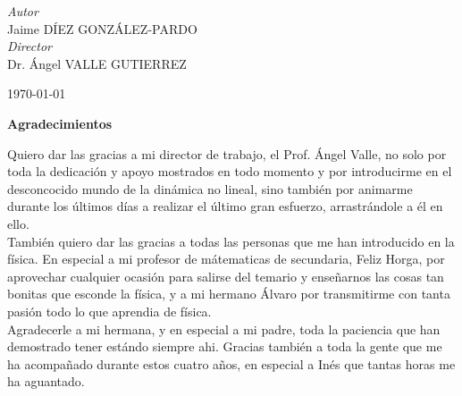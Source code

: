 \documentclass[a4paper, 11pt, oneside]{book}
\begin{document}
\begin{titlepage}
			
				\begin{flushright}
					\large
					\textit{Autor}\\
					Jaime \textsc{DÍEZ GONZÁLEZ-PARDO} \\ %
					\large
					\textit{Director}\\
					Dr. Ángel \textsc{VALLE GUTIERREZ} %
				\end{flushright}
			
			
				\vfill\vfill\vfill %
				
				{\large\today} %
				
			
				\vfill %
		
		\end{titlepage}

			\begin{center}
				\textbf{ \large Agradecimientos}
			\end{center}
					
				Quiero dar las gracias a mi director de trabajo, el Prof. \'Angel Valle, no solo por toda la dedicaci\'on y apoyo mostrados en todo momento y por introducirme en el desconcocido mundo de la din\'amica no lineal, sino tambi\'en por animarme durante los \'ultimos d\'ias a realizar el \'ultimo gran esfuerzo, arrastr\'andole a \'el en ello.  \\
					
				Tambi\'en quiero dar las gracias a todas las personas que me han introducido en la f\'isica. En especial a mi profesor de m\'atematicas de secundaria, Feliz Horga, por aprovechar cualquier ocasi\'on para salirse del temario y enseñarnos las cosas tan bonitas que esconde la física, y a mi hermano Álvaro por transmitirme con tanta pasión todo lo que aprendia de física. \\

				Agradecerle a mi hermana, y en especial a mi padre, toda la paciencia que han demostrado tener estándo siempre ahi. Gracias también a toda la gente que me ha acompañado durante estos cuatro años, en especial a Inés que tantas horas me ha aguantado. \\
\end{document}
